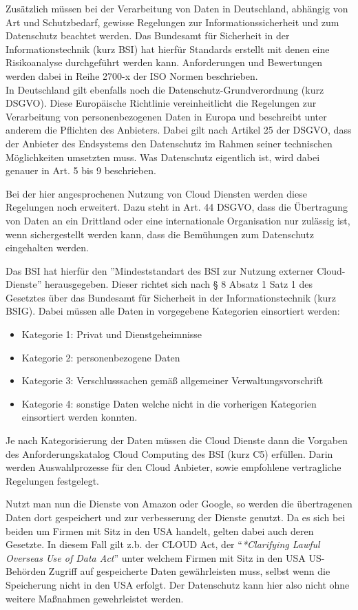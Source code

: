\documentclass[
]{article}
\begin{document}
Zusätzlich müssen bei der Verarbeitung von Daten in Deutschland,
abhängig von Art und Schutzbedarf, gewisse Regelungen zur
Informationssicherheit und zum Datenschutz beachtet werden. Das
Bundesamt für Sicherheit in der Informationstechnik (kurz BSI) hat
hierfür Standards erstellt mit denen eine Risikoanalyse durchgeführt
werden kann. Anforderungen und Bewertungen werden dabei in Reihe 2700-x
der ISO Normen beschrieben. \\
In Deutschland gilt ebenfalls noch die Datenschutz-Grundverordnung (kurz
DSGVO). Diese Europäische Richtlinie vereinheitlicht die Regelungen zur
Verarbeitung von personenbezogenen Daten in Europa und beschreibt unter
anderem die Pflichten des Anbieters. Dabei gilt nach Artikel 25 der
DSGVO, dass der Anbieter des Endsystems den Datenschutz im Rahmen seiner
technischen Möglichkeiten umsetzten muss. Was Datenschutz eigentlich
ist, wird dabei genauer in Art. 5 bis 9 beschrieben.

Bei der hier angesprochenen Nutzung von Cloud Diensten werden diese
Regelungen noch erweitert. Dazu steht in Art. 44 DSGVO, dass die
Übertragung von Daten an ein Drittland oder eine internationale
Organisation nur zulässig ist, wenn sichergestellt werden kann, dass die
Bemühungen zum Datenschutz eingehalten werden.

Das BSI hat hierfür den ''Mindeststandart des BSI zur Nutzung externer
Cloud-Dienste'' herausgegeben. Dieser richtet sich nach § 8 Absatz 1
Satz 1 des Gesetztes über das Bundesamt für Sicherheit in der
Informationstechnik (kurz BSIG). Dabei müssen alle Daten in vorgegebene
Kategorien einsortiert werden:

\begin{itemize}
\item
  Kategorie 1: Privat und Dienstgeheimnisse
\item
  Kategorie 2: personenbezogene Daten
\item
  Kategorie 3: Verschlusssachen gemäß allgemeiner Verwaltungsvorschrift
\item
  Kategorie 4: sonstige Daten welche nicht in die vorherigen Kategorien
  einsortiert werden konnten.
\end{itemize}

Je nach Kategorisierung der Daten müssen die Cloud Dienste dann die
Vorgaben des Anforderungskatalog Cloud Computing des BSI (kurz C5)
erfüllen. Darin werden Auswahlprozesse für den Cloud Anbieter, sowie
empfohlene vertragliche Regelungen festgelegt.

Nutzt man nun die Dienste von Amazon oder Google, so werden die
übertragenen Daten dort gespeichert und zur verbesserung der Dienste
genutzt. Da es sich bei beiden um Firmen mit Sitz in den USA handelt,
gelten dabei auch deren Gesetzte. In diesem Fall gilt z.b. der CLOUD
Act, der ``\emph{*Clarifying Lawful Overseas Use of Data Act}'' unter
welchem Firmen mit Sitz in den USA US-Behörden Zugriff auf gespeicherte
Daten gewährleisten muss, selbst wenn die Speicherung nicht in den USA
erfolgt. Der Datenschutz kann hier also nicht ohne weitere Maßnahmen
gewehrleistet werden.
\end{document}
